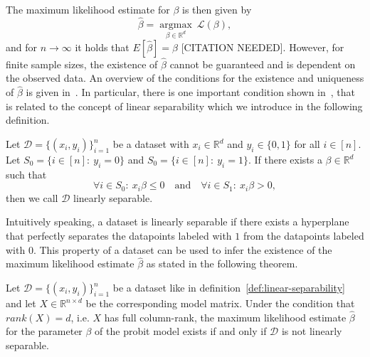The maximum likelihood estimate for $\beta$ is then given by
\begin{equation}
    \label{eq:maximum-likelihood-estimate}
    \hat{\beta} = \underset{\beta \in \mathbb{R}^d}{\operatorname{argmax}}\
    \mathcal{L}(\beta),
\end{equation}
and for $n \rightarrow \infty$ it holds that
$E[\hat{\beta}] = \beta$ [CITATION NEEDED].
However, for finite sample sizes, the existence of $\hat{\beta}$
cannot be guaranteed and is dependent on the observed data.
An overview of the conditions for the existence and uniqueness of
$\hat{\beta}$ is given in~\cite{probit-computational}.
In particular, there is one important condition shown
in~\cite{probit-existence}, that is related to the concept of
linear separability which we introduce in the following definition.
\begin{definition}
    \label{def:linear-separability}
    Let $\mathcal{D}=\{(x_i, y_i)\}_{i=1}^n$ be a dataset with
    $x_i \in \mathbb{R}^d$ and $y_i \in \{0, 1\}$ for all $i \in [n]$.
    Let $S_0 = \{i \in [n]:\ y_i = 0\}$ and $S_0 = \{i \in [n]:\ y_i = 1\}$.
    If there exists a $\beta \in \mathbb{R}^d$ such that
    \begin{equation*}
        \forall i \in S_0:\ x_i \beta \leq 0\quad \text{and}\quad \forall i \in S_1:\ x_i \beta > 0,
    \end{equation*}
    then we call $\mathcal{D}$ linearly separable.
\end{definition}

\noindent Intuitively speaking, a dataset is linearly separable if there
exists a hyperplane that perfectly separates the datapoints labeled
with $1$ from the datapoints labeled with $0$.
This property of a dataset can be used to infer the existence of the
maximum likelihood estimate $\hat{\beta}$ as stated in the following
theorem.

\begin{theorem}
    \label{theorem:probit-existence}
    Let $\mathcal{D}=\{(x_i, y_i)\}_{i=1}^n$ be a dataset like in
    definition~\ref{def:linear-separability} and let
    $X \in \mathbb{R}^{n \times d}$ be the corresponding model matrix.
    Under the condition that $rank(X)=d$, i.e. $X$ has full column-rank,
    the maximum likelihood estimate $\hat{\beta}$ for the
    parameter $\beta$ of the probit model
    exists if and only if $\mathcal{D}$ is not linearly separable.
\end{theorem}

